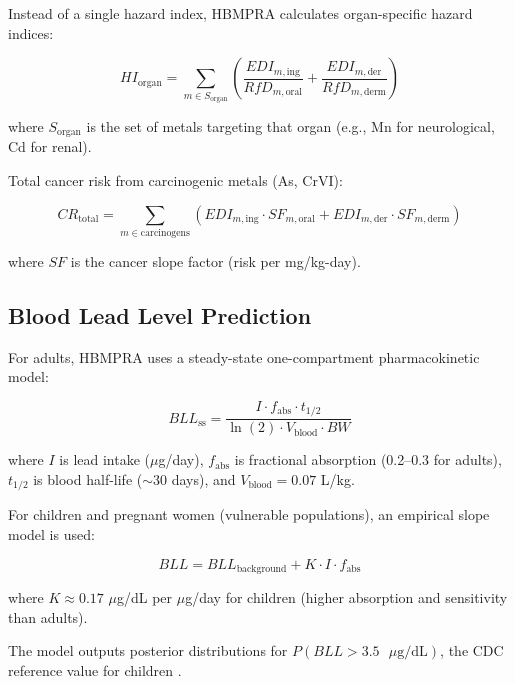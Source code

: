 \documentclass[11pt,a4paper]{article}
\begin{document}
Instead of a single hazard index, HBMPRA calculates organ-specific hazard indices:

\begin{equation}
HI_{\text{organ}} = \sum_{m \in S_{\text{organ}}} \left( \frac{EDI_{m,\text{ing}}}{RfD_{m,\text{oral}}} + \frac{EDI_{m,\text{der}}}{RfD_{m,\text{derm}}} \right)
\label{eq:hi_organ}
\end{equation}

where $S_{\text{organ}}$ is the set of metals targeting that organ (e.g., Mn for neurological, Cd for renal).

Total cancer risk from carcinogenic metals (As, CrVI):

\begin{equation}
CR_{\text{total}} = \sum_{m \in \text{carcinogens}} \left( EDI_{m,\text{ing}} \cdot SF_{m,\text{oral}} + EDI_{m,\text{der}} \cdot SF_{m,\text{derm}} \right)
\label{eq:cancer_risk}
\end{equation}

where $SF$ is the cancer slope factor (risk per mg/kg-day).

\subsection{Blood Lead Level Prediction}

For adults, HBMPRA uses a steady-state one-compartment pharmacokinetic model:

\begin{equation}
BLL_{\text{ss}} = \frac{I \cdot f_{\text{abs}} \cdot t_{1/2}}{\ln(2) \cdot V_{\text{blood}} \cdot BW}
\label{eq:bll_adult}
\end{equation}

where $I$ is lead intake ($\mu$g/day), $f_{\text{abs}}$ is fractional absorption (0.2--0.3 for adults), $t_{1/2}$ is blood half-life ($\sim$30 days), and $V_{\text{blood}} = 0.07$ L/kg.

For children and pregnant women (vulnerable populations), an empirical slope model is used:

\begin{equation}
BLL = BLL_{\text{background}} + K \cdot I \cdot f_{\text{abs}}
\label{eq:bll_child}
\end{equation}

where $K \approx 0.17$ $\mu$g/dL per $\mu$g/day for children (higher absorption and sensitivity than adults).

The model outputs posterior distributions for $P(BLL > 3.5 \text{ }\mu\text{g/dL})$, the CDC reference value for children \citep{CDC:2021}.
\end{document}
